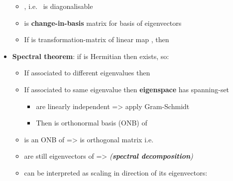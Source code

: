 \begin{itemize}
        \begin{itemize}

          \item
                , i.e.~ is diagonalisable
          \item
                 is \textbf{change-in-basis} matrix for
                basis
                 of
                eigenvectors
          \item
                If  is transformation-matrix of linear
                map , then
        \end{itemize}
  \item
        \textbf{Spectral theorem}: if  is Hermitian then
         exists, so:

        \begin{itemize}

          \item
                If  associated to different
                eigenvalues then 
          \item
                If associated to same eigenvalue \iMbox{\lambda} then
                \textbf{eigenspace}  has spanning-set

                \begin{itemize}

                  \item
                         are linearly
                        independent =\textgreater{} apply Gram-Schmidt
                  \item
                        Then  is
                        orthonormal basis (ONB) of 
                \end{itemize}
          \item
                 is
                an ONB of  =\textgreater{}
                 is
                orthogonal matrix i.e.~
          \item
                 are still eigenvectors
                of  =\textgreater{} 
                \emph{(\textbf{spectral decomposition})}
          \item
                 can be interpreted as scaling
                in direction of its eigenvectors:


\end{itemize}
\end{itemize}
